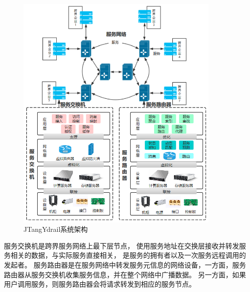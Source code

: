   \begin{figure}[htbp]
    \centering
    \includegraphics[width=10cm]{./images/system.png}
    \caption{JTangYdrail系统架构\cite{zhanghuan}}
    \label{fig:system}
  \end{figure}

  服务交换机是跨界服务网络上最下层节点，
  使用服务地址在交换层接收并转发服务相关的数据，与实际服务直接相关，
  是服务的拥有者以及一次服务远程调用的发起者。
    服务路由器是在服务网络中转发服务元信息的网络设备，一方面，服务路由器从服务交换机收集服务信息，并在整个网络中广播数据。 
    另一方面，如果用户调用服务，则服务路由器会将请求转发到相应的服务节点。 




